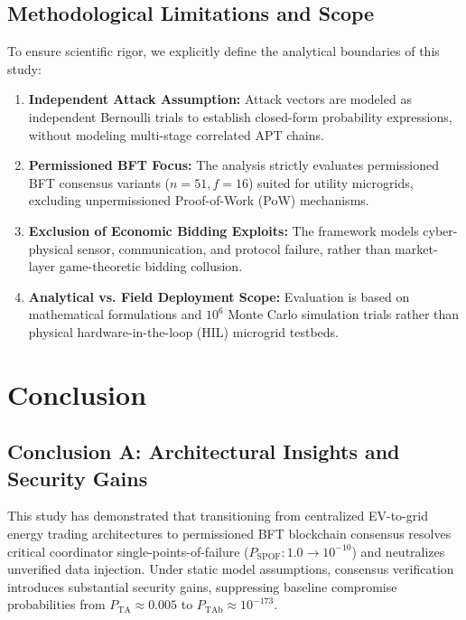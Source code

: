 \documentclass[10pt,twocolumn,journal]{IEEEtran}
\begin{document}
\subsection{Methodological Limitations and Scope}
To ensure scientific rigor, we explicitly define the analytical boundaries of this study:
\begin{enumerate}[leftmargin=*]
    \item \textbf{Independent Attack Assumption:} Attack vectors are modeled as independent Bernoulli trials to establish closed-form probability expressions, without modeling multi-stage correlated APT chains.
    \item \textbf{Permissioned BFT Focus:} The analysis strictly evaluates permissioned BFT consensus variants ($n=51, f=16$) suited for utility microgrids, excluding unpermissioned Proof-of-Work (PoW) mechanisms.
    \item \textbf{Exclusion of Economic Bidding Exploits:} The framework models cyber-physical sensor, communication, and protocol failure, rather than market-layer game-theoretic bidding collusion.
    \item \textbf{Analytical vs. Field Deployment Scope:} Evaluation is based on mathematical formulations and $10^6$ Monte Carlo simulation trials rather than physical hardware-in-the-loop (HIL) microgrid testbeds.
\end{enumerate}


\section{Conclusion}
\label{sec:conclusion}

\subsection{Conclusion A: Architectural Insights and Security Gains}
This study has demonstrated that transitioning from centralized EV-to-grid energy trading architectures to permissioned BFT blockchain consensus resolves critical coordinator single-points-of-failure ($P_{\text{SPOF}}: 1.0 \to 10^{-10}$) and neutralizes unverified data injection. Under static model assumptions, consensus verification introduces substantial security gains, suppressing baseline compromise probabilities from $P_{\text{TA}} \approx 0.005$ to $P_{\text{TAb}} \approx 10^{-173}$.
\end{document}
